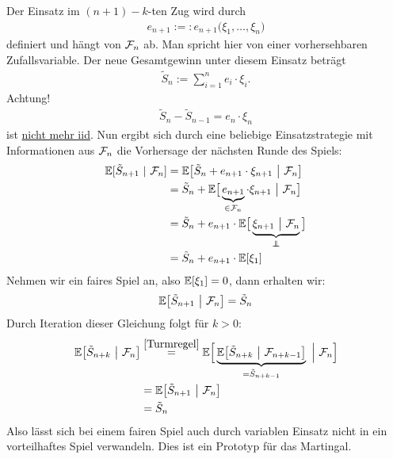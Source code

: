\begin{beisp}
Der Einsatz im $(n+1)-k$-ten Zug wird durch 
\begin{align*}
e_{n+1}:=:e_{n+1}\big(\xi_1,\ldots,\xi_n\big)
\end{align*}
definiert und hängt von $\mathcal{F}_n$ ab. Man spricht hier von einer vorhersehbaren Zufallsvariable.
Der neue Gesamtgewinn unter diesem Einsatz beträgt
\begin{align*}
\tilde{S}_n:=\sum\limits_{i=1}^n e_i\cdot\xi_i.
\end{align*}
Achtung! 
\begin{align*}
\tilde{S}_n-\tilde{S}_{n-1}=e_n\cdot\xi_n
\end{align*}
ist \underline{nicht mehr iid}.\nl
Nun ergibt sich durch eine beliebige Einsatzstrategie mit Informationen aus $\mathcal{F}_n$ die Vorhersage der nächsten Runde des Spiels:
\begin{align*}
\E[\tilde{S}_{n+1}~|~\F_n] 
&=\E\big[\tilde{S}_n+ e_{n+1}\cdot\xi_{n+1}~\big|~\F_n\big]\\
&=\tilde{S}_n+\E\big[\underbrace{e_{n+1}}_{\in\F_n}\cdot\xi_{n+1}~\big|~\F_n\big]\\
&=\tilde{S}_n+e_{n+1}\cdot\E\big[\underbrace{\xi_{n+1}~\big|~\F_n}_{\unab}\big]\\
&=\tilde{S}_n+e_{n+1}\cdot\E[\xi_1]
\end{align*}
Nehmen wir ein faires Spiel an, also $\mathbb{E}[\xi_1]=0$, dann erhalten wir:
\begin{align*}
\mathbb{E}\big[\tilde{S}_{n+1}~\big|~\mathcal{F}_n\big]=\tilde{S}_n
\end{align*}
Durch Iteration dieser Gleichung folgt für $k>0$:
\begin{align*}
\mathbb{E}\big[\tilde{S}_{n+k}~\big|~\mathcal{F}_n\big]
&\stackrel{\eqref{Turmregel}}{=}
\mathbb{E}\Big[\underbrace{\mathbb{E}\big[\tilde{S}_{n+k}~\big|~\mathcal{F}_{n+k-1}\big]}_{=\tilde{S}_{n+k-1}}~\Big|~\mathcal{F}_n\Big]\\
&=\mathbb{E}\big[\tilde{S}_{n+1}~\big|~\mathcal{F}_n\big]\\
&=\tilde{S}_n
\end{align*}
Also lässt sich bei einem fairen Spiel auch durch variablen Einsatz nicht in ein vorteilhaftes Spiel verwandeln. Dies ist ein Prototyp für das Martingal.
\end{beisp}

